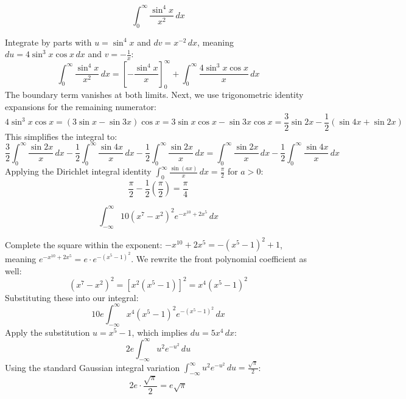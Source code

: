 \begin{questions}

\question
\[ \int_{0}^{\infty} \frac{\sin^4 x}{x^2} \,dx \]
\begin{solution}
Integrate by parts with $u = \sin^4 x$ and $dv = x^{-2} \,dx$, meaning $du = 4\sin^3 x \cos x \,dx$ and $v = -\frac{1}{x}$:
\[ \int_{0}^{\infty} \frac{\sin^4 x}{x^2} \,dx = \left[ -\frac{\sin^4 x}{x} \right]_{0}^{\infty} + \int_{0}^{\infty} \frac{4\sin^3 x \cos x}{x} \,dx \]
The boundary term vanishes at both limits. Next, we use trigonometric identity expansions for the remaining numerator:
\[ 4\sin^3 x \cos x = (3\sin x - \sin 3x)\cos x = 3\sin x \cos x - \sin 3x \cos x = \frac{3}{2}\sin 2x - \frac{1}{2}(\sin 4x + \sin 2x) \]
This simplifies the integral to:
\[ \frac{3}{2}\int_{0}^{\infty} \frac{\sin 2x}{x} \,dx - \frac{1}{2}\int_{0}^{\infty} \frac{\sin 4x}{x} \,dx - \frac{1}{2}\int_{0}^{\infty} \frac{\sin 2x}{x} \,dx = \int_{0}^{\infty} \frac{\sin 2x}{x} \,dx - \frac{1}{2}\int_{0}^{\infty} \frac{\sin 4x}{x} \,dx \]
Applying the Dirichlet integral identity $\int_{0}^{\infty} \frac{\sin(ax)}{x} \,dx = \frac{\pi}{2}$ for $a > 0$:
\[ \frac{\pi}{2} - \frac{1}{2}\left(\frac{\pi}{2}\right) = \frac{\pi}{4} \]
\end{solution}

\question
\[ \int_{-\infty}^{\infty} 10 (x^7 - x^2)^2 e^{-x^{10} + 2x^5} \,dx \]
\begin{solution}
Complete the square within the exponent: $-x^{10} + 2x^5 = -(x^5 - 1)^2 + 1$, meaning $e^{-x^{10} + 2x^5} = e \cdot e^{-(x^5 - 1)^2}$.
We rewrite the front polynomial coefficient as well:
\[ (x^7 - x^2)^2 = \left[ x^2(x^5 - 1) \right]^2 = x^4(x^5 - 1)^2 \]
Substituting these into our integral:
\[ 10e \int_{-\infty}^{\infty} x^4(x^5 - 1)^2 e^{-(x^5 - 1)^2} \,dx \]
Apply the substitution $u = x^5 - 1$, which implies $du = 5x^4 \,dx$:
\[ 2e \int_{-\infty}^{\infty} u^2 e^{-u^2} \,du \]
Using the standard Gaussian integral variation $\int_{-\infty}^{\infty} u^2 e^{-u^2} \,du = \frac{\sqrt{\pi}}{2}$:
\[ 2e \cdot \frac{\sqrt{\pi}}{2} = e\sqrt{\pi} \]
\end{solution}


\end{questions}
